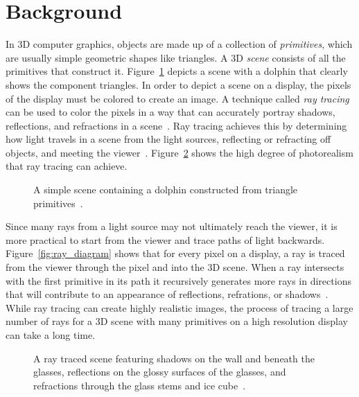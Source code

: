 \documentclass{sig-alternate}
\begin{document}
\section{Background}
\label{sec:background}

In 3D computer graphics, objects are made up of a collection of \emph{primitives}, which are usually simple geometric shapes like triangles. A 3D \emph{scene} consists of all the primitives that construct it. Figure~\ref{fig:dolphin} depicts a scene with a dolphin that clearly shows the component triangles. In order to depict a scene on a display, the pixels of the display must be colored to create an image. A technique called \emph{ray tracing} can be used to color the pixels in a way that can accurately portray shadows, reflections, and refractions in a scene~\cite{Viitanen:2015}. Ray tracing achieves this by determining how light travels in a scene from the light sources, reflecting or refracting off objects, and meeting the viewer~\cite{Whitted:1980}. Figure~\ref{fig:glasses} shows the high degree of photorealism that ray tracing can achieve.

\begin{figure}
\centering
{}
\caption{A simple scene containing a dolphin constructed from triangle primitives~\cite{wiki:mesh}.}
\label{fig:dolphin}
\end{figure}

Since many rays from a light source may not ultimately reach the viewer, it is more practical to start from the viewer and trace paths of light backwards. Figure~\ref{fig:ray_diagram} shows that for every pixel on a display, a ray is traced from the viewer through the pixel and into the 3D scene. When a ray intersects with the first primitive in its path it recursively generates more rays in directions that will contribute to an appearance of reflections, refrations, or shadows~\cite{Whitted:1980}. While ray tracing can create highly realistic images, the process of tracing a large number of rays for a 3D scene with many primitives on a high resolution display can take a long time.

\begin{figure}[t]
\centering
{}
\caption{A ray traced scene featuring shadows on the wall and beneath the glasses, reflections on the glossy surfaces of the glasses, and refractions through the glass stems and ice cube~\cite{wiki:rayTracing}.}
\label{fig:glasses}
\end{figure}
\end{document}
